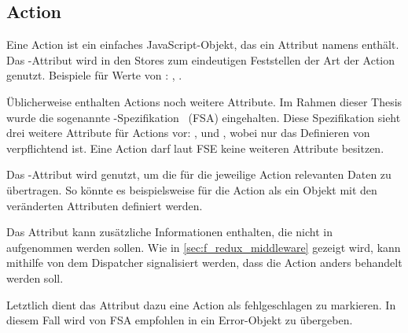 \subsection{Action}
\label{ssec:gf_action}

Eine Action ist ein einfaches JavaScript-Objekt, das ein Attribut namens
 enthält.  Das -Attribut wird in den Stores zum
eindeutigen Feststellen der Art der Action genutzt.  Beispiele für Werte von
:  , .

Üblicherweise enthalten Actions noch weitere Attribute.  Im Rahmen dieser Thesis
wurde die sogenannte
-Spezifikation~\cite{fsa} (FSA)
eingehalten.  Diese Spezifikation sieht drei weitere Attribute für Actions vor:
,  und , wobei nur das Definieren von
 verpflichtend ist.  Eine Action darf laut FSE keine weiteren
Attribute besitzen.

Das -Attribut wird genutzt, um die für die jeweilige Action
relevanten Daten zu übertragen.  So könnte es beispielsweise für die Action
 als ein Objekt mit den veränderten Attributen definiert
werden.

Das Attribut  kann zusätzliche Informationen enthalten, die nicht in
 aufgenommen werden sollen.  Wie in \cref{sec:f_redux_middleware}
gezeigt wird, kann mithilfe von  dem Dispatcher signalisiert werden,
dass die Action anders behandelt werden soll.

Letztlich dient das  Attribut dazu eine Action als fehlgeschlagen zu
markieren.  In diesem Fall wird von FSA empfohlen in  ein
Error-Objekt zu übergeben.
